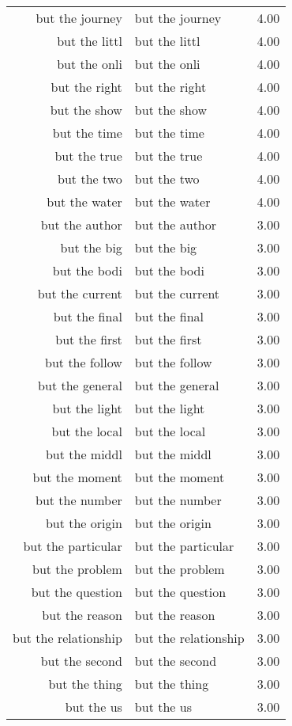 \begin{table}[ht]
\begin{tabular}{rlr}
  but the journey & but the journey & 4.00 \\ 
  but the littl & but the littl & 4.00 \\ 
  but the onli & but the onli & 4.00 \\ 
  but the right & but the right & 4.00 \\ 
  but the show & but the show & 4.00 \\ 
  but the time & but the time & 4.00 \\ 
  but the true & but the true & 4.00 \\ 
  but the two & but the two & 4.00 \\ 
  but the water & but the water & 4.00 \\ 
  but the author & but the author & 3.00 \\ 
  but the big & but the big & 3.00 \\ 
  but the bodi & but the bodi & 3.00 \\ 
  but the current & but the current & 3.00 \\ 
  but the final & but the final & 3.00 \\ 
  but the first & but the first & 3.00 \\ 
  but the follow & but the follow & 3.00 \\ 
  but the general & but the general & 3.00 \\ 
  but the light & but the light & 3.00 \\ 
  but the local & but the local & 3.00 \\ 
  but the middl & but the middl & 3.00 \\ 
  but the moment & but the moment & 3.00 \\ 
  but the number & but the number & 3.00 \\ 
  but the origin & but the origin & 3.00 \\ 
  but the particular & but the particular & 3.00 \\ 
  but the problem & but the problem & 3.00 \\ 
  but the question & but the question & 3.00 \\ 
  but the reason & but the reason & 3.00 \\ 
  but the relationship & but the relationship & 3.00 \\ 
  but the second & but the second & 3.00 \\ 
  but the thing & but the thing & 3.00 \\ 
  but the us & but the us & 3.00 \\ 

\end{tabular}
\end{table}
